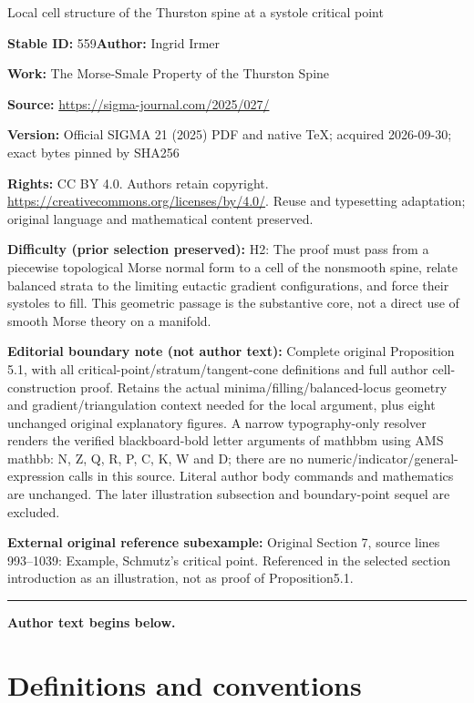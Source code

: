 \documentclass[11pt]{article}
\numberwithin{equation}{section}
\numberwithin{equation}{section}
\begin{document}
\begin{center}\Large Local cell structure of the Thurston spine at a systole critical point\end{center}
\noindent\textbf{Stable ID:} 559\quad\textbf{Author:} Ingrid Irmer\par
\noindent\textbf{Work:} The Morse-Smale Property of the Thurston Spine\par
\noindent\textbf{Source:} \url{https://sigma-journal.com/2025/027/}\par
\noindent\textbf{Version:} Official SIGMA 21 (2025) PDF and native TeX; acquired 2026-09-30; exact bytes pinned by SHA256\par
\noindent\textbf{Rights:} CC BY 4.0. Authors retain copyright. \url{https://creativecommons.org/licenses/by/4.0/}. Reuse and typesetting adaptation; original language and mathematical content preserved.\par
\noindent\textbf{Difficulty (prior selection preserved):} {\CJKfont H2: The proof must pass from a piecewise topological Morse normal form to a cell of the nonsmooth spine, relate balanced strata to the limiting eutactic gradient configurations, and force their systoles to fill. This geometric passage is the substantive core, not a direct use of smooth Morse theory on a manifold.}\par
\medskip\noindent\textbf{Editorial boundary note (not author text):} Complete original Proposition 5.1, with all critical-point/stratum/tangent-cone definitions and full author cell-construction proof. Retains the actual minima/filling/balanced-locus geometry and gradient/triangulation context needed for the local argument, plus eight unchanged original explanatory figures. A narrow typography-only resolver renders the verified blackboard-bold letter arguments of mathbbm using AMS mathbb: N, Z, Q, R, P, C, K, W and D; there are no numeric/indicator/general-expression calls in this source. Literal author body commands and mathematics are unchanged. The later illustration subsection and boundary-point sequel are excluded.\par
\noindent\textbf{External original reference subexample:} Original Section 7, source lines 993–1039: Example, Schmutz’s critical point. Referenced in the selected section introduction as an illustration, not as proof of Proposition5.1.\par
\medskip\hrule\medskip\noindent\textbf{Author text begins below.}\par
\setcounter{section}{1}
\section{Definitions and conventions}
\label{sub:defns}
\end{document}
